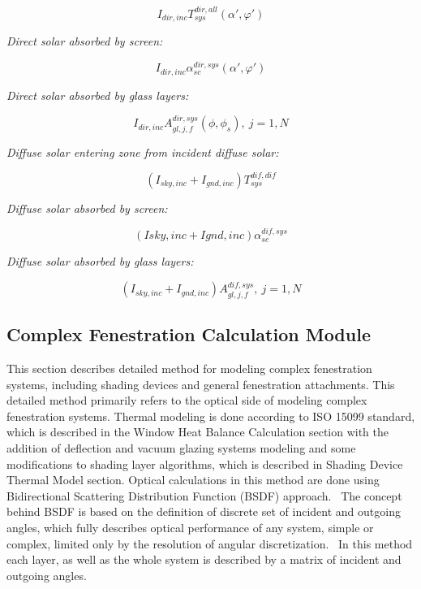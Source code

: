 \begin{equation}
{I_{dir,inc}}T_{sys}^{dir,all}\left( {\alpha ',\varphi '} \right)
\end{equation}

\emph{Direct solar absorbed by screen:}

\begin{equation}
{I_{dir,inc}}\alpha_{sc}^{dir,sys}\left( {\alpha ',\varphi '} \right)
\end{equation}

\emph{Direct solar absorbed by glass layers:}

\begin{equation}
{I_{dir,inc}}A_{gl,j,f}^{dir,sys}(\phi ,{\phi_s}),{\mathrm{    }}~j = 1,N
\end{equation}

\emph{Diffuse solar entering zone from incident diffuse solar:}

\begin{equation}
\left( {{I_{sky,inc}} + {I_{gnd,inc}}} \right)T_{sys}^{dif,dif}
\end{equation}

\emph{Diffuse solar absorbed by screen:}

\begin{equation}
\left( {Isky,inc + Ignd,inc} \right)\alpha_{sc}^{dif,sys}
\end{equation}

\emph{Diffuse solar absorbed by glass layers:}

\begin{equation}
({I_{sky,inc}} + {I_{gnd,inc}})A_{gl,j,f}^{dif,sys},{\mathrm{   }}~j = 1,N{\mathrm{ }}
\end{equation}

\subsection{Complex Fenestration Calculation Module}\label{complex-fenestration-calculation-module}

This section describes detailed method for modeling complex fenestration systems, including shading devices and general fenestration attachments. This detailed method primarily refers to the optical side of modeling complex fenestration systems. Thermal modeling is done according to ISO 15099 standard, which is described in the Window Heat Balance Calculation section with the addition of deflection and vacuum glazing systems modeling and some modifications to shading layer algorithms, which is described in Shading Device Thermal Model section. Optical calculations in this method are done using Bidirectional Scattering Distribution Function (BSDF) approach.~ The concept behind BSDF is based on the definition of discrete set of incident and outgoing angles, which fully describes optical performance of any system, simple or complex, limited only by the resolution of angular discretization.~ In this method each layer, as well as the whole system is described by a matrix of incident and outgoing angles.

